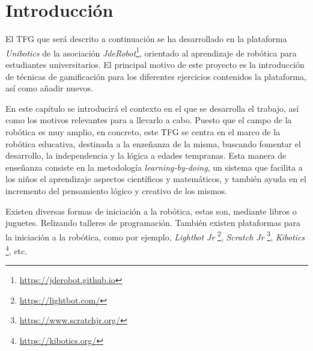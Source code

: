 \documentclass[a4paper, 12pt]{book}
\begin{document}
\tableofcontents 
\cleardoublepage
\listoffigures %



\cleardoublepage
\chapter{Introducción}
\label{sec:intro} %

El TFG que será descrito a continuación se ha desarrollado en la plataforma \textit{Unibotics} de la asociación \textit{JdeRobot}\footnote{\url{https://jderobot.github.io}}, orientado al aprendizaje de robótica para estudiantes universitarios. El principal motivo de este proyecto es la introducción de técnicas de gamificación para los diferentes ejercicios contenidos la plataforma, así como añadir nuevos.

En este capítulo se introducirá el contexto en el que se desarrolla el trabajo, así como los motivos relevantes para a llevarlo a cabo. Puesto que el campo de la robótica es muy amplio, en concreto, este TFG se centra en el marco de la robótica educativa, destinada a la enzeñanza de la misma, buscando fomentar el desarrollo, la independencia y la lógica a edades tempranas. Esta manera de enseñanza consiste en la metodología \emph{learning-by-doing}, un sistema que facilita a los niños el aprendizaje aspectos científicos y matemáticos, y también ayuda en el incremento del pensamiento lógico y creativo de los mismos.

Existen diversas formas de iniciación a la robótica, estas son, mediante libros o juguetes. Relizando talleres de programación. También existen plataformas para la iniciación a la robótica, como por ejemplo, \emph{Lightbot Jr} \footnote{\url{https://lightbot.com/}}, \emph{Scratch Jr} \footnote{\url{https://www.scratchjr.org/}}, \emph{Kibotics} \footnote{\url{https://kibotics.org/}}, etc.
\end{document}
